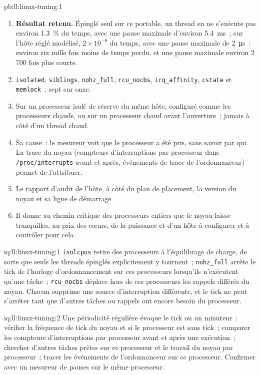 \begin{solution}{pb:ll:linux-tuning:1}
\begin{enumerate}
que l'invité ne voit pas ni ne peut déplacer, et un utilisateur ordinaire ne peut pas modifier la ligne de démarrage.
\item \textbf{Résultat retenu.} Épinglé seul sur ce portable, un thread en  ne s'exécute pas environ 1.3~\% du temps, avec une
pause maximale d'environ \qty{5.4}{\milli\second}~; sur l'hôte réglé modélisé, $2 \times 10^{-6}$ du temps, avec une pause maximale de
\qty{2}{\micro\second}~: environ six mille fois moins de temps perdu, et une pause maximale environ 2\,700 fois plus courte.
\item \texttt{isolated}, \texttt{siblings}, \texttt{nohz\_full}, \texttt{rcu\_nocbs}, \texttt{irq\_affinity},
\texttt{cstate} et \texttt{memlock}~: sept sur onze.
\item Sur un processeur isolé de réserve du même hôte, configuré comme les processeurs chauds, ou sur un processeur chaud avant
l'ouverture~; jamais à côté d'un thread chaud.
\item Sa cause~: le mesureur voit que le processeur a été pris, sans savoir par qui. La trace du noyau (compteurs d'interruptions
par processeur dans \texttt{/proc/interrupts} avant et après, événements de trace de l'ordonnanceur) permet de l'attribuer.
\item Le rapport d'audit de l'hôte, à côté du plan de placement, la version du noyau et sa ligne de démarrage.
\item Il donne au chemin critique des processeurs entiers que le noyau laisse tranquilles, au prix des cœurs, de la puissance et
d'un hôte à configurer et à contrôler pour cela.
\end{enumerate}
\end{solution}

\begin{solution}{iq:ll:linux-tuning:1}
\texttt{isolcpus} retire des processeurs à l'équilibrage de charge, de sorte que seuls les threads épinglés explicitement y tournent~; \texttt{nohz\_full} arrête
le tick de l'horloge d'ordonnancement sur ces processeurs lorsqu'ils n'exécutent qu'une tâche~; \texttt{rcu\_nocbs} déplace hors de ces processeurs les rappels différés du noyau.
Chacun supprime une source d'interruption différente, et le tick ne peut s'arrêter tant que d'autres tâches ou rappels ont encore besoin du processeur.
\end{solution}

\begin{solution}{iq:ll:linux-tuning:2}
Une périodicité régulière évoque le tick ou un minuteur~: vérifier la fréquence de tick du noyau et si le processeur est
sans tick~; comparer les compteurs d'interruptions par processeur avant et après une exécution~; chercher d'autres tâches prêtes sur ce processeur et le travail du noyau par processeur~; tracer
les événements de l'ordonnanceur sur ce processeur. Confirmer avec un mesureur de pauses sur le même processeur.
\end{solution}

